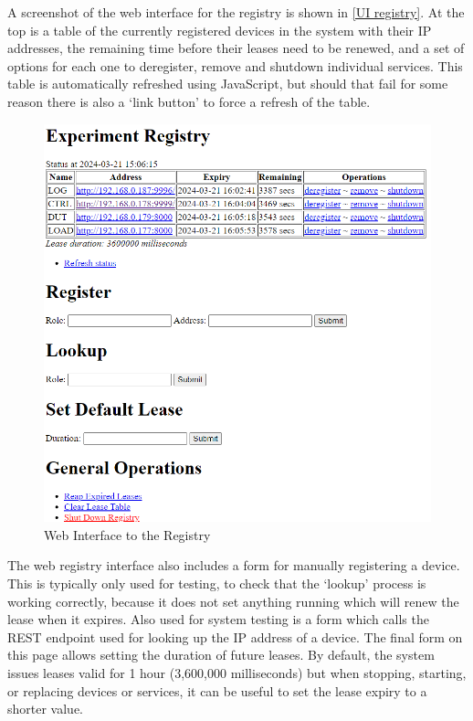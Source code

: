 A screenshot of the web interface for the registry is shown in \autoref{UI registry}. At the top is a table of the currently registered devices in the system with their IP addresses, the remaining time before their leases need to be renewed, and a set of options for each one to deregister, remove and shutdown individual services. This table is automatically refreshed using JavaScript, but should that fail for some reason there is also a `link button' to force a refresh of the table.

\begin{figure}[ht!]
\centering
\includegraphics[width=\columnwidth]{Figures/screenshots/Registry.png}
\caption{Web Interface to the Registry}
\label{UI registry}
\end{figure}

The web registry interface also includes a form for manually registering a device. This is typically only used for testing, to check that the `lookup' process is working correctly, because it does not set anything running which will renew the lease when it expires. Also used for system testing is a form which calls the REST endpoint used for looking up the IP address of a device. The final form on this page allows setting the duration of future leases. By default, the system issues leases valid for 1 hour (3,600,000 milliseconds) but when stopping, starting, or replacing devices or services, it can be useful to set the lease expiry to a shorter value.

